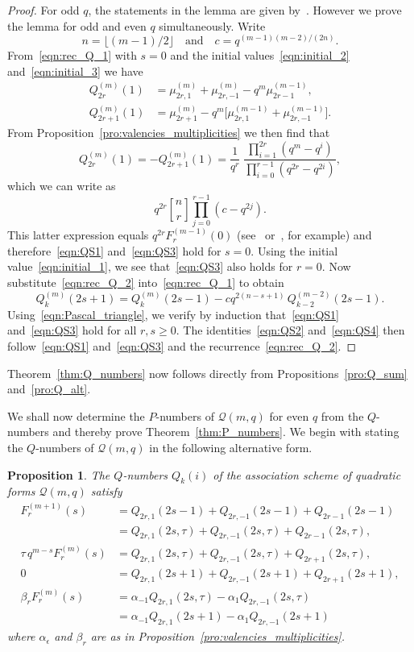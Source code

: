 \documentclass[10pt]{article}
\newtheorem{prop}[theorem]{Proposition}
\theoremstyle{definition}
\newcommand{\Q}{\mathscr{Q}}
\renewcommand{\t}{\tau}
\newcommand{\e}{\epsilon}
\newcommand{\floor}[1]{\lfloor#1\rfloor}
\begin{document}
\begin{proof}
For odd $q$, the statements in the lemma are given by~\cite[Lemma~6.2]{Sch2015}. However we prove the lemma for odd and even $q$ simultaneously. Write 
\[
n=\floor{(m-1)/2}\quad\text{and}\quad c=q^{(m-1)(m-2)/(2n)}.
\]
From~\eqref{eqn:rec_Q_1} with $s=0$ and the initial values~\eqref{eqn:initial_2} and~\eqref{eqn:initial_3} we have
\begin{align*}
Q^{(m)}_{2r}(1)  &=\mu^{(m)}_{2r,1}+\mu^{(m)}_{2r,-1}-q^m\mu^{(m-1)}_{2r-1},\\
Q^{(m)}_{2r+1}(1)&=\mu^{(m)}_{2r+1}-q^m\big[\mu^{(m-1)}_{2r,1}+\mu^{(m-1)}_{2r,-1}\big].
\end{align*}
From Proposition~\ref{pro:valencies_multiplicities} we then find that
\[
Q^{(m)}_{2r}(1)=-Q^{(m)}_{2r+1}(1)=\frac{1}{q^r}\;\frac{\prod\limits_{i=1}^{2r}(q^m-q^i)}{\prod\limits_{i=0}^{r-1}(q^{2r}-q^{2i})},
\]
which we can write as
\[
q^{2r}\genfrac{[}{]}{0pt}{}{n}{r}\prod_{j=0}^{r-1}(c-q^{2j}).
\]
This latter expression equals $q^{2r}F^{(m-1)}_r(0)$ (see~\cite{DelGoe1975} or~\cite{Sch2015}, for example) and therefore~\eqref{eqn:QS1} and~\eqref{eqn:QS3} hold for $s=0$. Using the initial value~\eqref{eqn:initial_1}, we see that~\eqref{eqn:QS3} also holds for $r=0$. Now substitute~\eqref{eqn:rec_Q_2} into~\eqref{eqn:rec_Q_1} to obtain
\[
Q^{(m)}_k(2s+1)=Q^{(m)}_k(2s-1)-cq^{2(n-s+1)}\,Q^{(m-2)}_{k-2}(2s-1).
\]
Using~\eqref{eqn:Pascal_triangle}, we verify by induction that~\eqref{eqn:QS1} and~\eqref{eqn:QS3} hold for all $r,s\ge 0$. The identities~\eqref{eqn:QS2} and~\eqref{eqn:QS4} then follow~\eqref{eqn:QS1} and~\eqref{eqn:QS3} and the recurrence~\eqref{eqn:rec_Q_2}. 
\end{proof}
\par
Theorem~\ref{thm:Q_numbers} now follows directly from Propositions~\ref{pro:Q_sum} and~\ref{pro:Q_alt}.
\par
We shall now determine the $P$-numbers of $\Q(m,q)$ for even $q$ from the $Q$-numbers and thereby prove Theorem~\ref{thm:P_numbers}. We begin with stating the $Q$-numbers of $\Q(m,q)$ in the following alternative form.
\begin{prop}
\label{pro:Q_numbers_sums}
The $Q$-numbers $Q_k(i)$ of the association scheme of quadratic forms $\Q(m,q)$ satisfy
\begin{align}
F^{(m+1)}_r(s)&=Q_{2r,1}(2s-1)+Q_{2r,-1}(2s-1)+Q_{2r-1}(2s-1)   \label{eqn:Q_sum_1}\\
&=Q_{2r,1}(2s,\t)+Q_{2r,-1}(2s,\t)+Q_{2r-1}(2s,\t),   \nonumber\\%
\t\,q^{m-s}F^{(m)}_r(s)&=Q_{2r,1}(2s,\t)+Q_{2r,-1}(2s,\t)+Q_{2r+1}(2s,\t),   \label{eqn:Q_sum_2}\\
0&=Q_{2r,1}(2s+1)+Q_{2r,-1}(2s+1)+Q_{2r+1}(2s+1),   \label{eqn:Q_sum_2b}\\%
\beta_rF^{(m)}_r(s)&=\alpha_{-1}Q_{2r,1}(2s,\t)-\alpha_1 Q_{2r,-1}(2s,\t)   \label{eqn:Q_sum_3}\\
&=\alpha_{-1}Q_{2r,1}(2s+1)-\alpha_1Q_{2r,-1}(2s+1)   \nonumber
\end{align}
where $\alpha_\e$ and $\beta_r$ are as in Proposition~\ref{pro:valencies_multiplicities}.
\end{prop}
\end{document}
